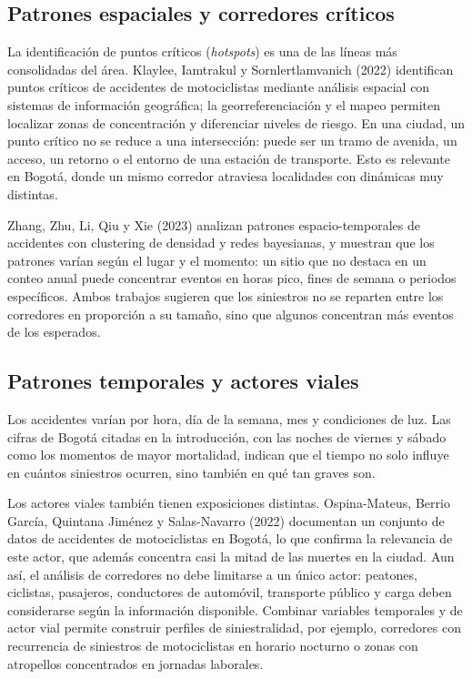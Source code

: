 \documentclass[12pt,letterpaper]{article}
\begin{document}
\hypertarget{patrones-espaciales-y-corredores-cruxedticos}{%
\subsection{Patrones espaciales y corredores
críticos}\label{patrones-espaciales-y-corredores-cruxedticos}}

La identificación de puntos críticos (\emph{hotspots}) es una de las
líneas más consolidadas del área. Klaylee, Iamtrakul y Sornlertlamvanich
(2022) identifican puntos críticos de accidentes de motociclistas
mediante análisis espacial con sistemas de información geográfica; la
georreferenciación y el mapeo permiten localizar zonas de concentración
y diferenciar niveles de riesgo. En una ciudad, un punto crítico no se
reduce a una intersección: puede ser un tramo de avenida, un acceso, un
retorno o el entorno de una estación de transporte. Esto es relevante
en Bogotá, donde un mismo corredor atraviesa localidades con dinámicas
muy distintas.

Zhang, Zhu, Li, Qiu y Xie (2023) analizan patrones espacio-temporales de
accidentes con clustering de densidad y redes bayesianas, y muestran que
los patrones varían según el lugar y el momento: un sitio que no destaca
en un conteo anual puede concentrar eventos en horas pico, fines de
semana o periodos específicos. Ambos trabajos sugieren que los
siniestros no se reparten entre los corredores en proporción a su
tamaño, sino que algunos concentran más eventos de los esperados.

\hypertarget{patrones-temporales-y-actores-viales}{%
\subsection{Patrones temporales y actores
viales}\label{patrones-temporales-y-actores-viales}}

Los accidentes varían por hora, día de la semana, mes y condiciones de
luz. Las cifras de Bogotá citadas en la introducción, con las noches de
viernes y sábado como los momentos de mayor mortalidad, indican que el
tiempo no solo influye en cuántos siniestros ocurren, sino también en
qué tan graves son.

Los actores viales también tienen exposiciones distintas.
Ospina-Mateus, Berrio García, Quintana Jiménez y Salas-Navarro (2022)
documentan un conjunto de datos de accidentes de motociclistas en
Bogotá, lo que confirma la relevancia de este actor, que además
concentra casi la mitad de las muertes en la ciudad. Aun así, el
análisis de corredores no debe limitarse a un único actor: peatones,
ciclistas, pasajeros, conductores de automóvil, transporte público y
carga deben considerarse según la información disponible. Combinar
variables temporales y de actor vial permite construir perfiles de
siniestralidad, por ejemplo, corredores con recurrencia de siniestros de
motociclistas en horario nocturno o zonas con atropellos concentrados en
jornadas laborales.
\end{document}
